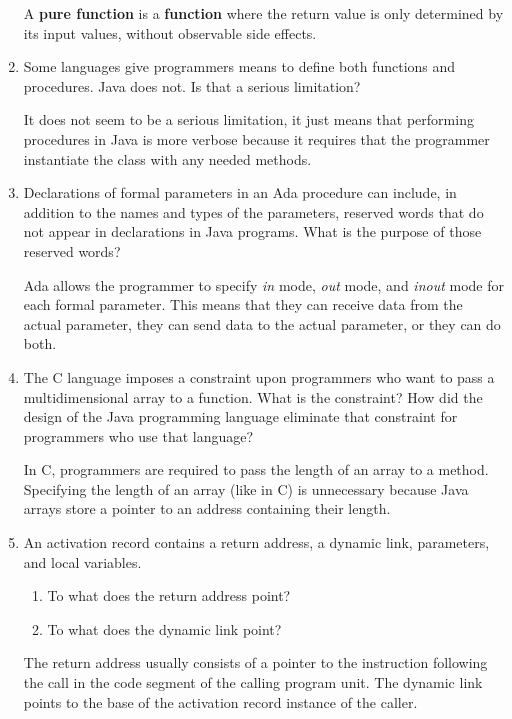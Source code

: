 \begin{enumerate}
A \textbf{pure function} is a \textbf{function} where the return value is only determined by its input values, without observable side effects.

  \item Some languages give programmers means to define
    both functions and procedures. Java does not. Is that
    a serious limitation?

It does not seem to be a serious limitation, it just means that performing procedures in Java is more verbose because it requires that the programmer instantiate the class with any needed methods.


  \item Declarations of formal parameters in an Ada procedure
    can include, in addition to the names and types of the
    parameters, reserved words that do not appear in declarations
    in Java programs. 
    What is the purpose of those reserved words?
    
    Ada allows the programmer to specify \textit{in} mode, \textit{out} mode, and \textit{inout} mode for each formal parameter.  This means that they can receive data from the actual parameter, they can send data to the actual parameter, or they can do both.
 
  \item The C language imposes a constraint upon programmers
    who want to pass a multidimensional array to a function.
    What is the constraint? How did the design of the Java
    programming language eliminate that constraint for 
    programmers who use that language?

In C, programmers are required to pass the length of an array to a method. Specifying the length of an array (like in C) is unnecessary because Java arrays store a pointer to an address containing their length.


  \item An activation record contains a return
    address, a dynamic link, parameters, and
    local variables.
  \begin{enumerate}
    \item To what does the return address point?
    \item To what does the dynamic link point?
    \end{enumerate}
    
    The return address usually consists of a pointer to the instruction following the call in the code segment of the calling program unit.  The dynamic link points to the base of the activation record instance of the caller.



\end{enumerate}
